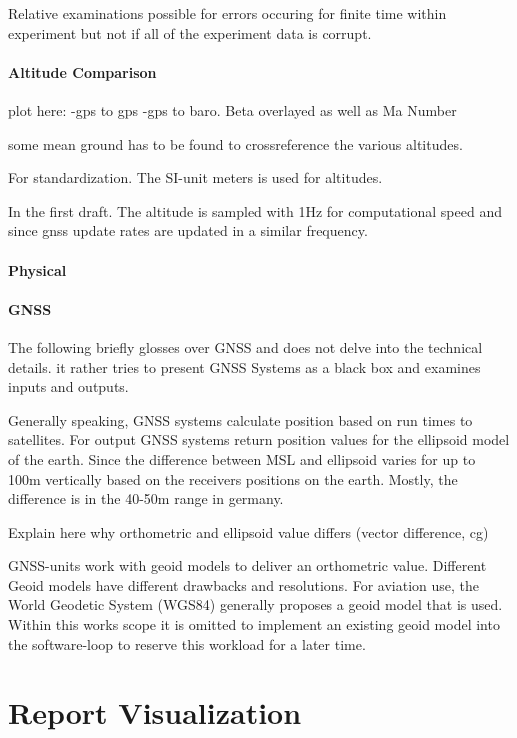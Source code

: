 Relative examinations possible for errors occuring for finite time within experiment but not if all of the experiment data is corrupt.

\paragraph{Altitude Comparison}

plot here: -gps to gps -gps to baro. Beta overlayed as well as Ma Number


some mean ground has to be found to crossreference the various altitudes.

For standardization. The SI-unit meters is used for altitudes.

In the first draft. The altitude is sampled with 1Hz for computational speed and since gnss update rates are updated in a similar frequency.

\paragraph{ Physical}

\paragraph{ GNSS}

The following briefly glosses over GNSS and does not delve into the technical details. it rather tries to present GNSS Systems as a black box and examines inputs and outputs.

Generally speaking, GNSS systems calculate position based on run times to satellites. For output GNSS systems return position values for the ellipsoid model of the earth. Since the difference between MSL and ellipsoid varies for up to 100m vertically based on the receivers positions on the earth. Mostly, the difference is in the 40-50m range in germany.

Explain here why orthometric and ellipsoid value differs (vector difference, cg)

GNSS-units work with geoid models to deliver an orthometric value. Different Geoid models have different drawbacks and resolutions. For aviation use, the World Geodetic System (WGS84) generally proposes a geoid model that is used. Within this works scope it is omitted to implement an existing geoid model into the software-loop to reserve this workload for a later time.

\newpage
\section{Report Visualization}


